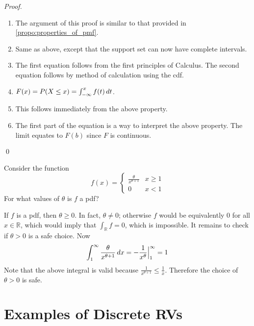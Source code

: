 \documentclass[notoc,notitlepage]{tufte-book}
\begin{document}
\begin{proof}
  \begin{enumerate}
    \item The argument of this proof is similar to that provided in \cref{propo:properties_of_pmf}.
    \item Same as above, except that the support set can now have complete intervals.
    \item The first equation follows from the first principles of Calculus. The second equation follows by method of calculation using the cdf.
    \item $F(x) = P(X \leq x) = \int_{-\infty}^{x} f(t) \mathop{}\!d{t}$.
    \item This follows immediately from the above property.
    \item The first part of the equation is a way to interpret the above property. The limit equates to $F(b)$ since $F$ is continuous.
  \end{enumerate}\qed
\end{proof}

\begin{eg}
  Consider the function
  \begin{equation*}
    f(x) = \begin{cases}
      \frac{\theta}{x^{\theta + 1}}   & x \geq 1 \\
      0                               & x < 1 
    \end{cases}
  \end{equation*}
  For what values of $\theta$ is $f$ a pdf?

  \begin{solution}
    If $f$ is a pdf, then $\theta \geq 0$. In fact, $\theta \neq 0$; otherwise $f$ would be equivalently $0$ for all $x \in \mathbb{R}$, which would imply that $\int_\mathbb{R} f = 0$, which is impossible. It remains to check if $\theta > 0$ is a safe choice. Now
    \begin{equation*}
      \int_{1}^{\infty} \frac{\theta}{x^{\theta + 1}} \mathop{}\!d{x} = - \frac{1}{x^{\theta}} \Big|_{1}^{\infty} = 1
    \end{equation*}
    Note that the above integral is valid because $\frac{1}{x^{\theta + 1}} \leq \frac{1}{x}$. Therefore the choice of $\theta > 0$ is safe.
  \end{solution}
\end{eg}


\section{Examples of Discrete RVs}
\label{sec:examples_of_discrete_rvs}
\end{document}
